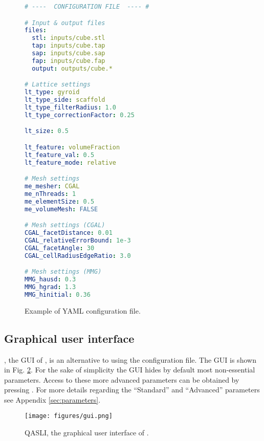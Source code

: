 \begin{figure}[htb]
\centering
\begin{minipage}{.9\linewidth}
%
\begin{lstlisting}[language=yaml]
# ----  CONFIGURATION FILE  ---- #

# Input & output files
files:
  stl: inputs/cube.stl
  tap: inputs/cube.tap
  sap: inputs/cube.sap
  fap: inputs/cube.fap
  output: outputs/cube.*

# Lattice settings
lt_type: gyroid
lt_type_side: scaffold
lt_type_filterRadius: 1.0
lt_type_correctionFactor: 0.25

lt_size: 0.5

lt_feature: volumeFraction
lt_feature_val: 0.5
lt_feature_mode: relative

# Mesh settings
me_mesher: CGAL
me_nThreads: 1
me_elementSize: 0.5
me_volumeMesh: FALSE

# Mesh settings (CGAL)
CGAL_facetDistance: 0.01
CGAL_relativeErrorBound: 1e-3
CGAL_facetAngle: 30
CGAL_cellRadiusEdgeRatio: 3.0

# Mesh settings (MMG)
MMG_hausd: 0.3
MMG_hgrad: 1.3
MMG_hinitial: 0.36
\end{lstlisting}
\end{minipage}

	\caption{Example of YAML configuration file.}
	\label{fig:config}
\end{figure}

\subsection{Graphical user interface}
\qasli{}, the GUI of \asli{}, is an alternative to using the configuration file. The GUI is shown in Fig. \ref{fig:gui}.  For the sake of simplicity the GUI hides by default most non-essential parameters. Access to these more advanced parameters can be obtained by pressing . For more details regarding the ``Standard'' and ``Advanced'' parameters see Appendix \ref{sec:parameters}.

\begin{figure}[htb]
	\centering
	\texttt{[image: figures/gui.png]}%
	
	\caption{QASLI, the graphical user interface of \asli{}.}
	\label{fig:gui}
\end{figure}


